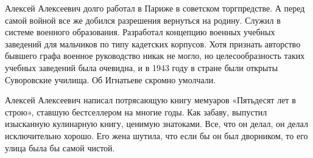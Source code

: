 Алексей Алексеевич долго работал в Париже в советском торгпредстве. А перед
самой войной все же добился разрешения вернуться на родину. Служил в системе
военного образования. Разработал концепцию военных учебных заведений для
мальчиков по типу кадетских корпусов. Хотя признать авторство бывшего графа
военное руководство никак не могло, но целесообразность таких учебных заведений
была очевидна, и в 1943 году в стране были открыты Суворовские училища. Об
Игнатьеве скромно умолчали. 

Алексей Алексеевич написал потрясающую книгу мемуаров «Пятьдесят лет в строю»,
ставшую бестселлером на многие годы. Как забаву, выпустил изысканную кулинарную
книгу, ценимую знатоками. Все, что он делал, он делал исключительно хорошо. Его
жена шутила, что если бы он был дворником, то его улица была бы самой чистой.

